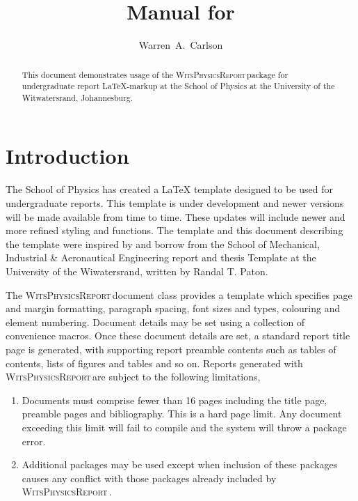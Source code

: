 \documentclass[10pt, a4paper, oneside]{article}
\author{Warren~A.~Carlson}
\title{Manual for \WitsPhysicsReport}
\newcommand{\WitsPhysicsReport}{\textrm{\textsc{WitsPhysicsReport}}\,}
\begin{document}
\maketitle

\begin{abstract}
This document demonstrates usage of the \WitsPhysicsReport package for undergraduate report \LaTeX-markup at the School of Physics at the University of the Witwatersrand, Johannesburg.
\end{abstract}

\tableofcontents

\section{Introduction}
\label{sec:Introduction}

\par{The School of Physics has created a \LaTeX{} template designed to be used for undergraduate reports. This template is under development and newer versions will be made available from time to time.  These updates will include newer and more refined styling and functions. The template and this document describing the template were inspired by and borrow from the School of Mechanical, Industrial \& Aeronautical Engineering report and thesis Template at the University of the Wiwatersrand, written by Randal T. Paton.}

\par{The \WitsPhysicsReport document class provides a template which specifies page and margin formatting, paragraph spacing, font sizes and types, colouring and element numbering. Document details may be set using a collection of convenience macros. Once these document details are set, a standard report title page is generated, with supporting report preamble contents such as tables of contents, lists of figures and tables and so on. Reports generated with \WitsPhysicsReport are subject to the following limitations,
    \begin{enumerate}
        \item{Documents must comprise fewer than 16 pages including the title page, preamble pages and bibliography.  This is a hard page limit.  Any document exceeding this limit will fail to compile and the system will throw a package error.}
        \item{Additional packages may be used except when inclusion of these packages causes any conflict with those packages already included by \WitsPhysicsReport.}
    \end{enumerate}
}
\end{document}
